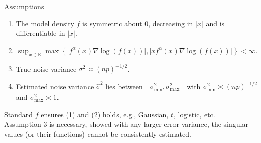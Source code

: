 \documentclass{beamer}
\begin{document}
\begin{frame}{Assumptions}
    \begin{enumerate}
        \item The model density $f$ is symmetric about $0$, decreasing in $\vert x\vert$ and is differentiable in $\vert x\vert$.
        \item $\sup_{x \in \mathbb{R}} \max\left\{ \vert f^\alpha(x)\nabla \log(f(x)) \vert, \vert x f^\alpha(x)\nabla \log(f(x)) \vert \right\} < \infty$.
        \item True noise variance $\sigma^2 \asymp (np)^{-1/2}$. 
        \item Estimated noise variance $\hat{\sigma}^2$ lies between $[\sigma^2_{\min}, \sigma^2_{\max}]$ with $\sigma^2_{\min} \asymp (np)^{-1/2}$ and $\sigma^2_{\max} \asymp 1$. 
    \end{enumerate}
    \pause

    \vspace*{1em}
    Standard $f$ ensures (1) and (2) holds, e.g., Gaussian, $t$, logistic, etc.\\

    \vspace*{0.5em}
    Assumption 3 is \alert{necessary}, \cite{shabalin2013reconstruction} showed with any larger error variance, the singular values (or their functions) cannot be consistently estimated.
\end{frame}
\end{document}
